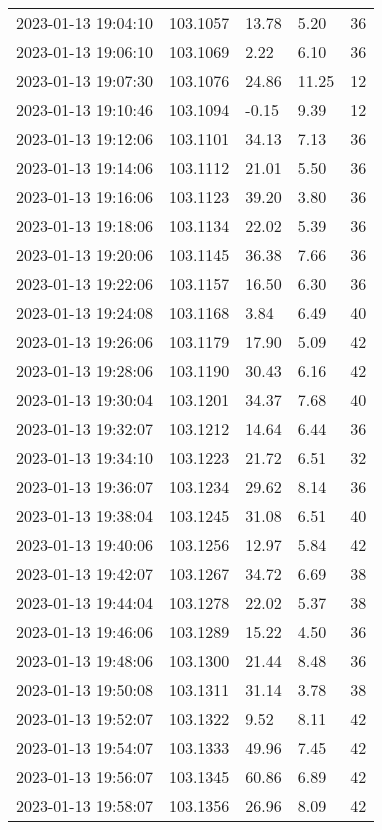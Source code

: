 \documentclass{nature_plusfigure}
\begin{document}
\begin{supplement}
\begin{center}
\begin{longtable}{lllll}
2023-01-13 19:04:10 & 103.1057 & 13.78 & 5.20 & 36 \\ 
2023-01-13 19:06:10 & 103.1069 & 2.22 & 6.10 & 36 \\ 
2023-01-13 19:07:30 & 103.1076 & 24.86 & 11.25 & 12 \\ 
2023-01-13 19:10:46 & 103.1094 & -0.15 & 9.39 & 12 \\ 
2023-01-13 19:12:06 & 103.1101 & 34.13 & 7.13 & 36 \\ 
2023-01-13 19:14:06 & 103.1112 & 21.01 & 5.50 & 36 \\ 
2023-01-13 19:16:06 & 103.1123 & 39.20 & 3.80 & 36 \\ 
2023-01-13 19:18:06 & 103.1134 & 22.02 & 5.39 & 36 \\ 
2023-01-13 19:20:06 & 103.1145 & 36.38 & 7.66 & 36 \\ 
2023-01-13 19:22:06 & 103.1157 & 16.50 & 6.30 & 36 \\ 
2023-01-13 19:24:08 & 103.1168 & 3.84 & 6.49 & 40 \\ 
2023-01-13 19:26:06 & 103.1179 & 17.90 & 5.09 & 42 \\ 
2023-01-13 19:28:06 & 103.1190 & 30.43 & 6.16 & 42 \\ 
2023-01-13 19:30:04 & 103.1201 & 34.37 & 7.68 & 40 \\ 
2023-01-13 19:32:07 & 103.1212 & 14.64 & 6.44 & 36 \\ 
2023-01-13 19:34:10 & 103.1223 & 21.72 & 6.51 & 32 \\ 
2023-01-13 19:36:07 & 103.1234 & 29.62 & 8.14 & 36 \\ 
2023-01-13 19:38:04 & 103.1245 & 31.08 & 6.51 & 40 \\ 
2023-01-13 19:40:06 & 103.1256 & 12.97 & 5.84 & 42 \\ 
2023-01-13 19:42:07 & 103.1267 & 34.72 & 6.69 & 38 \\ 
2023-01-13 19:44:04 & 103.1278 & 22.02 & 5.37 & 38 \\ 
2023-01-13 19:46:06 & 103.1289 & 15.22 & 4.50 & 36 \\ 
2023-01-13 19:48:06 & 103.1300 & 21.44 & 8.48 & 36 \\ 
2023-01-13 19:50:08 & 103.1311 & 31.14 & 3.78 & 38 \\ 
2023-01-13 19:52:07 & 103.1322 & 9.52 & 8.11 & 42 \\ 
2023-01-13 19:54:07 & 103.1333 & 49.96 & 7.45 & 42 \\ 
2023-01-13 19:56:07 & 103.1345 & 60.86 & 6.89 & 42 \\ 
2023-01-13 19:58:07 & 103.1356 & 26.96 & 8.09 & 42 \\ 

\end{longtable}
\end{center}
\end{supplement}
\end{document}
